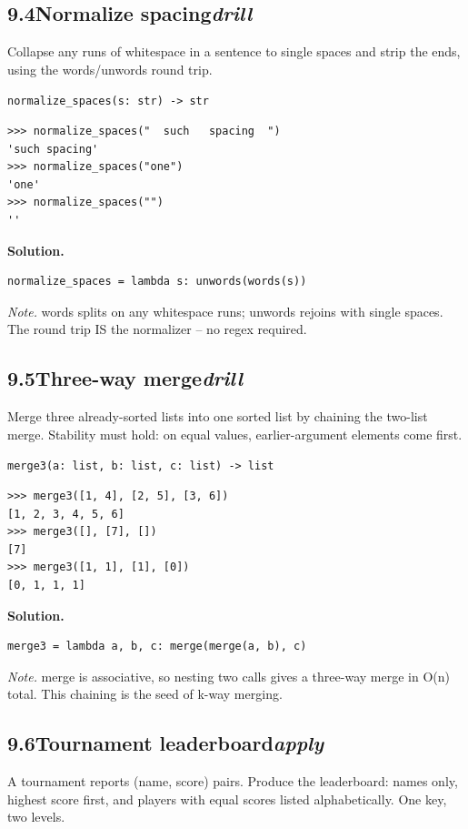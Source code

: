 \documentclass[10pt,letterpaper]{book}
\begin{document}
\subsection*{9.4\quad Normalize spacing\hfill\textnormal{\textit{drill}}}
Collapse any runs of whitespace in a sentence to single spaces and strip the ends, using the words/unwords round trip.

\noindent\texttt{normalize\_spaces(s: str) -> str}
\begin{lstlisting}[style=ex]
>>> normalize_spaces("  such   spacing  ")
'such spacing'
>>> normalize_spaces("one")
'one'
>>> normalize_spaces("")
''
\end{lstlisting}
\noindent\textbf{Solution.}
\begin{lstlisting}[style=code]
normalize_spaces = lambda s: unwords(words(s))
\end{lstlisting}
\noindent\textit{Note.} words splits on any whitespace runs; unwords rejoins with single spaces. The round trip IS the normalizer -- no regex required.

\subsection*{9.5\quad Three-way merge\hfill\textnormal{\textit{drill}}}
Merge three already-sorted lists into one sorted list by chaining the two-list merge. Stability must hold: on equal values, earlier-argument elements come first.

\noindent\texttt{merge3(a: list, b: list, c: list) -> list}
\begin{lstlisting}[style=ex]
>>> merge3([1, 4], [2, 5], [3, 6])
[1, 2, 3, 4, 5, 6]
>>> merge3([], [7], [])
[7]
>>> merge3([1, 1], [1], [0])
[0, 1, 1, 1]
\end{lstlisting}
\noindent\textbf{Solution.}
\begin{lstlisting}[style=code]
merge3 = lambda a, b, c: merge(merge(a, b), c)
\end{lstlisting}
\noindent\textit{Note.} merge is associative, so nesting two calls gives a three-way merge in O(n) total. This chaining is the seed of k-way merging.

\subsection*{9.6\quad Tournament leaderboard\hfill\textnormal{\textit{apply}}}
A tournament reports (name, score) pairs. Produce the leaderboard: names only, highest score first, and players with equal scores listed alphabetically. One key, two levels.
\end{document}
